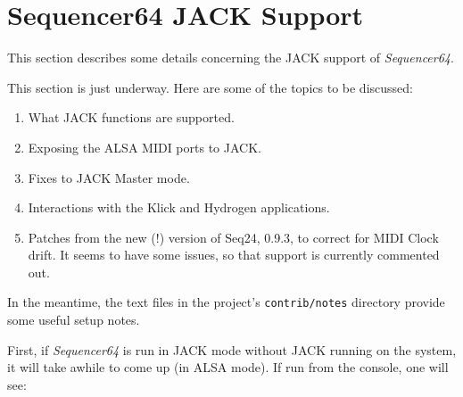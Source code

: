 %
%
%

\section{Sequencer64 JACK Support}
\label{sec:seq64_jack}

   This section describes some details concerning the JACK support of
   \textsl{Sequencer64}.

   This section is just underway.  Here are some of the topics to be discussed:

   \begin{enumerate}
      \item What JACK functions are supported.
      \item Exposing the ALSA MIDI ports to JACK.
      \item Fixes to JACK Master mode.
      \item Interactions with the Klick and Hydrogen applications.
      \item Patches from the new (!) version of Seq24, 0.9.3, to correct
         for MIDI Clock drift.  It seems to have some issues, so that support
         is currently commented out.
   \end{enumerate}

   In the meantime, the text files in the project's \texttt{contrib/notes}
   directory provide some useful setup notes.

   First, if \textsl{Sequencer64} is run in JACK mode without JACK running on
   the system, it will take awhile to come up (in ALSA mode).  If run from the
   console, one will see:

